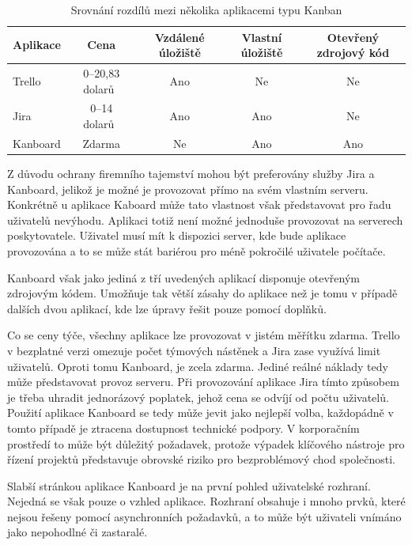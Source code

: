 \begin{table}[hbt]
\centering
\caption{Srovnání rozdílů mezi několika aplikacemi typu Kanban}
\label{tab:kanban-sum}
\begin{tabular}{ |l|c|c|c|c| } 
\hline
Aplikace & Cena\footnotemark & Vzdálené úložiště & Vlastní úložiště & Otevřený zdrojový kód  \\
\hline
Trello & 0--20,83 dolarů~\cite{bib:trello-pricing} & Ano & Ne & Ne \\ 
Jira & 0--14 dolarů~\cite{bib:jira-pricing} & Ano & Ano & Ne \\ 
Kanboard & Zdarma & Ne & Ano & Ano \\ 
\hline
\end{tabular}
\end{table}

Z důvodu ochrany firemního tajemství mohou být preferovány služby Jira a Kanboard, jelikož je možné je provozovat přímo na svém vlastním serveru. Konkrétně u aplikace Kaboard může tato vlastnost však představovat pro řadu uživatelů nevýhodu. Aplikaci totiž není možné jednoduše provozovat na serverech poskytovatele. Uživatel musí mít k dispozici server, kde bude aplikace provozována a to se může stát bariérou pro méně pokročilé uživatele počítače.

Kanboard však jako jediná z tří uvedených aplikací disponuje otevřeným zdrojovým kódem. Umožňuje tak větší zásahy do aplikace než je tomu v případě dalších dvou aplikací, kde lze úpravy řešit pouze pomocí doplňků.

Co se ceny týče, všechny aplikace lze provozovat v jistém měřítku zdarma. Trello v bezplatné verzi omezuje počet týmových nástěnek a Jira zase využívá limit uživatelů. Oproti tomu Kanboard, je zcela zdarma. Jediné reálné náklady tedy může představovat provoz serveru. Při provozování aplikace Jira tímto způsobem je třeba uhradit jednorázový poplatek, jehož cena se odvíjí od počtu uživatelů. Použití aplikace Kanboard se tedy může jevit jako nejlepší volba, každopádně v tomto případě je ztracena dostupnost technické podpory. V korporačním prostředí to může být důležitý požadavek, protože výpadek klíčového nástroje pro řízení projektů představuje obrovské riziko pro bezproblémový chod společnosti.

Slabší stránkou aplikace Kanboard je na první pohled uživatelské rozhraní. Nejedná se však pouze o vzhled aplikace. Rozhraní obsahuje i mnoho prvků, které nejsou řešeny pomocí asynchronních požadavků, a to může být uživateli vnímáno jako nepohodlné či zastaralé.

